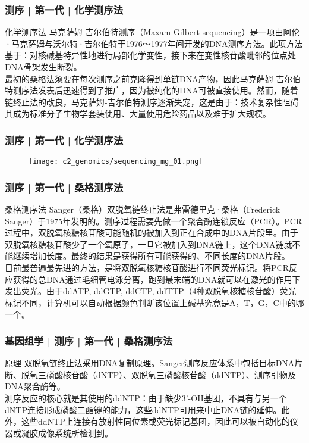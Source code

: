 \begin{frame}
  \frametitle{测序 | 第一代 | 化学测序法}
  \begin{block}{化学测序法}
马克萨姆-吉尔伯特测序（Maxam-Gilbert sequencing）是一项由阿伦·马克萨姆与沃尔特·吉尔伯特于1976～1977年间开发的DNA测序方法。此项方法基于：对核碱基特异性地进行局部化学变性，接下来在变性核苷酸毗邻的位点处DNA骨架发生断裂。\\
\vspace{1em}
最初的桑格法须要在每次测序之前克隆得到单链DNA产物，因此马克萨姆-吉尔伯特测序法发表后迅速得到了推广，因为被纯化的DNA可被直接使用。然而，随着链终止法的改良，马克萨姆-吉尔伯特测序逐渐失宠，这是由于：技术复杂性阻碍其成为标准分子生物学套装使用、大量使用危险药品以及难于扩大规模。
  \end{block}
\end{frame}

\begin{frame}
  \frametitle{测序 | 第一代 | 化学测序法}
  \begin{figure}
    \centering
    \texttt{[image: c2\_genomics/sequencing\_mg\_01.png]}
  \end{figure}
\end{frame}

\begin{frame}
  \frametitle{测序 | 第一代 | 桑格测序法}
  \begin{block}{桑格测序法}
Sanger（桑格）双脱氧链终止法是弗雷德里克·桑格（Frederick Sanger）于1975年发明的。测序过程需要先做一个聚合酶连锁反应（PCR）。PCR过程中，双脱氧核糖核苷酸可能随机的被加入到正在合成中的DNA片段里。由于双脱氧核糖核苷酸少了一个氧原子，一旦它被加入到DNA链上，这个DNA链就不能继续增加长度。最终的结果是获得所有可能获得的、不同长度的DNA片段。\\
\vspace{1em}
目前最普遍最先进的方法，是将双脱氧核糖核苷酸进行不同荧光标记。将PCR反应获得的总DNA通过毛细管电泳分离，跑到最末端的DNA就可以在激光的作用下发出荧光。由于ddATP, ddGTP, ddCTP, ddTTP（4种双脱氧核糖核苷酸）荧光标记不同，计算机可以自动根据颜色判断该位置上碱基究竟是A，T，G，C中的哪一个。
  \end{block}
\end{frame}

\begin{frame}
  \frametitle{基因组学 | 测序 | 第一代 | 桑格测序法}
  \begin{block}{原理}
双脱氧链终止法采用DNA复制原理。Sanger测序反应体系中包括目标DNA片断、脱氧三磷酸核苷酸（dNTP）、双脱氧三磷酸核苷酸（ddNTP）、测序引物及DNA聚合酶等。\\
\vspace{1em}
测序反应的核心就是其使用的ddNTP：由于缺少3'-OH基团，不具有与另一个dNTP连接形成磷酸二酯键的能力，这些ddNTP可用来中止DNA链的延伸。此外，这些ddNTP上连接有放射性同位素或荧光标记基团，因此可以被自动化的仪器或凝胶成像系统所检测到。
  \end{block}
\end{frame}

